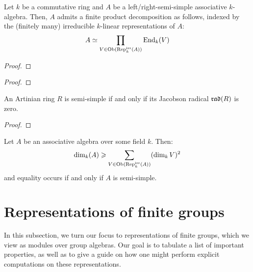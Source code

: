             \begin{theorem} \label{theorem: artin_wedderburn}
                Let $k$ be a commutative ring and $A$ be a left/right-semi-simple associative $k$-algebra. Then, $A$ admits a finite product decomposition as follows, indexed by the (finitely many) irreducible $k$-linear representations of $A$:
                    $$A \simeq \prod_{V \in \mathrm{Ob}(\mathrm{Rep}_k^{\mathrm{irr}}(A))} \mathrm{End}_k(V)$$
            \end{theorem}
                \begin{proof}
                    
                \end{proof}
            \begin{corollary} \label{coro: artin_wedderburn_over_fields}
                
            \end{corollary}
                \begin{proof}
                    
                \end{proof}
            \begin{proposition} \label{prop: semi_simple_iff_trivial_jacobson_radical_and_artinian}
                An Artinian ring $R$ is semi-simple if and only if its Jacobson radical $\mathfrak{rad}(R)$ is zero.
            \end{proposition}
                \begin{proof}
                    
                \end{proof}
            \begin{corollary} \label{coro: sum_of_squares_formula_for_semi_simple_algebras}
                Let $A$ be an associative algebra over some field $k$. Then:
                    $$\dim_k(A) \geqslant \sum_{V \in \mathrm{Ob}(\mathrm{Rep}_k^{\mathrm{irr}}(A))} (\dim_k V)^2$$
                and equality occurs if and only if $A$ is semi-simple.
            \end{corollary}
        
    \section{Representations of finite groups}
        In this subsection, we turn our focus to representations of finite groups, which we view as modules over group algebras. Our goal is to tabulate a list of important properties, as well as to give a guide on how one might perform explicit computations on these representations.
        
